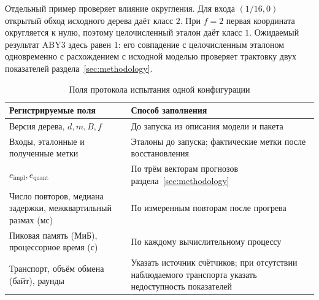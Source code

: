 Отдельный пример проверяет влияние округления. Для входа
$(1/16,0)$ открытый обход исходного дерева даёт класс $2$. При $f=2$
первая координата округляется к нулю, поэтому целочисленный эталон
даёт класс $1$. Ожидаемый результат ABY3 здесь равен $1$: его совпадение
с целочисленным эталоном одновременно с расхождением с исходной моделью
проверяет трактовку двух показателей раздела~\ref{sec:methodology}.

\begin{table}[htbp]
\caption{Поля протокола испытания одной конфигурации}
\centering\small
\begin{tabularx}{\linewidth}{|X|X|}
\hline
Регистрируемые поля & Способ заполнения \\ \hline
Версия дерева, $d,m,B,f$ & До запуска из описания модели и пакета \\ \hline
Входы, эталонные и полученные метки & Эталоны до запуска; фактические метки после восстановления \\ \hline
$e_{\mathrm{impl}},e_{\mathrm{quant}}$ & По трём векторам прогнозов раздела~\ref{sec:methodology} \\ \hline
Число повторов, медиана задержки, межквартильный размах (мс) & По измеренным повторам после прогрева \\ \hline
Пиковая память (МиБ), процессорное время (с) & По каждому вычислительному процессу \\ \hline
Транспорт, объём обмена (байт), раунды & Указать источник счётчиков; при отсутствии наблюдаемого транспорта указать недоступность показателей \\ \hline
\end{tabularx}
\end{table}
